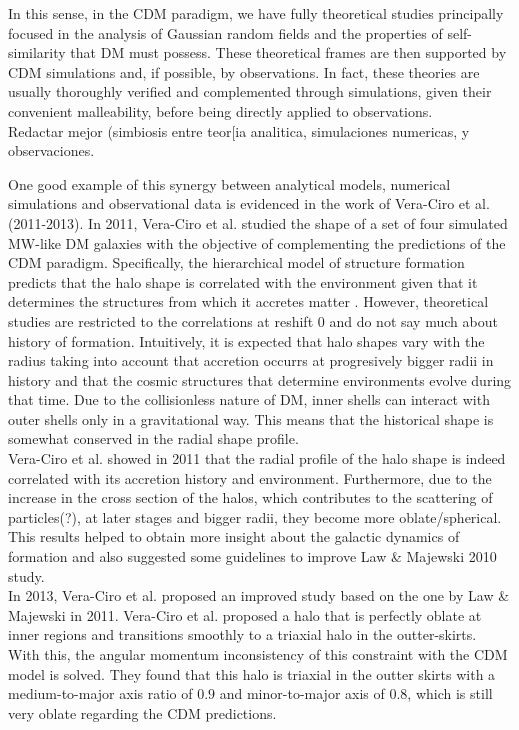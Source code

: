 In this sense, in the CDM paradigm, we have fully theoretical studies \cite{Bardeen et al. 1986,Schechter} principally focused in the analysis of Gaussian random fields and the properties of self-similarity that DM must possess. 
These theoretical frames are then supported by CDM simulations \cite{Cualquier estudio de CDM hace referencia a esos pilares} and, if possible, by observations. 
In fact, these theories are usually thoroughly verified and complemented through simulations, given their convenient malleability, before being directly applied to observations.\\ Redactar mejor (simbiosis entre teor[ia analitica, simulaciones numericas, y observaciones.

One good example of this synergy between analytical models, numerical simulations and observational data is evidenced in the work of Vera-Ciro et al. (2011-2013). In 2011, Vera-Ciro et al. studied the shape of a set of four simulated MW-like DM galaxies with the objective of complementing the predictions of the CDM paradigm. Specifically, the hierarchical model of structure formation predicts that the halo shape is correlated with the environment given that it determines the structures from which it accretes matter \cite{referencias sobre relacion entre forma y entorno}. However, theoretical studies are restricted to the correlations at reshift 0 and do not say much about history of formation. Intuitively, it is expected that halo shapes vary with the radius taking into account that accretion occurrs at progresively bigger radii in history and that the cosmic structures that determine environments evolve during that time. Due to the collisionless nature of DM, inner shells can interact with outer shells only in a gravitational way. This means that the historical shape is somewhat conserved in the radial shape profile.\\

Vera-Ciro et al.  showed in 2011 that the radial profile of the halo shape is indeed correlated with its accretion history and environment. Furthermore, due to the increase in the cross section of the halos, which contributes to the scattering of particles(?), at later stages and bigger radii, they become more oblate/spherical. This results helped to obtain more insight about the galactic dynamics of formation and also suggested some guidelines to improve Law \& Majewski 2010 study.\\

In 2013, Vera-Ciro et al. proposed an improved study based on the one by Law \& Majewski in 2011. Vera-Ciro et al. proposed a halo that is perfectly oblate at inner regions and transitions smoothly to a triaxial halo in the outter-skirts. With this, the angular momentum inconsistency of this constraint with the CDM model is solved. They found that this halo is triaxial in the outter skirts with a medium-to-major axis ratio of $0.9$ and minor-to-major axis of $0.8$, which is still very oblate regarding the CDM predictions.\\

